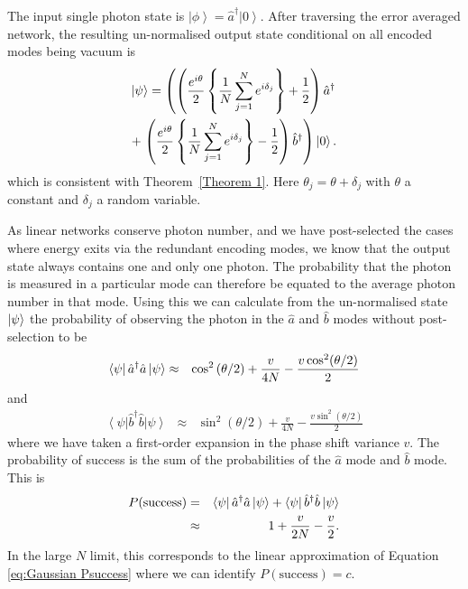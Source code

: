 \documentclass[aps,pra,twocolumn,superscriptaddress,numerical,floatfix]{revtex4-1}
\begin{document}
The input single photon state is $\left|\phi\right\rangle = \hat{a}^{\dagger}\left|0\right\rangle $.  After traversing the error averaged network, the resulting un-normalised output state conditional on all encoded modes being vacuum is
\begin{multline}
	\ket{\psi} = \left(
	\left( \frac{e^{i\theta}}{2} \left\{\frac{1}{N}\sum_{j=1}^{N}e^{i\delta_{j}}\right\} + \frac{1}{2}\right) \hat{a}^{\dagger}  \right. \\
	+ \left. \left(\frac{e^{i\theta}}{2} \left\{\frac{1}{N}\sum_{j=1}^{N}e^{i\delta_{j}}\right\} - \frac{1}{2}\right) \hat{b}^{\dagger} 
	\right)
	\ket{0}.
	\label{eq:1ParbN}
\end{multline}
which is consistent with Theorem~\ref{Theorem 1}. Here $\theta_{j}=\theta+\delta_{j}$ with $\theta$ a constant and $\delta_j$ a random variable. 

As linear networks conserve photon number, and we have post-selected the cases where energy exits via the redundant encoding modes, we know that the output state always contains one and only one photon.  The probability that the photon is measured in a particular mode can therefore be equated to the average photon number in that mode.  Using this we can calculate from the un-normalised state $\ket{\psi}$ the probability of observing the photon in the $\hat{a}$ and $\hat{b}$ modes without post-selection to be 
\begin{eqnarray}
	\bra{\psi} \hat{a}^{\dagger}\hat{a} \ket{\psi} & \approx & \cos^{2}\left(\theta/2\right)+\frac{v}{4N}-\frac{v\cos^{2}(\theta/2)}{2}
\end{eqnarray}
and
\begin{eqnarray}
	\left\langle \psi\right|\hat{b}^{\dagger}\hat{b}\left|\psi\right\rangle & \approx & \sin^{2}\left(\theta/2\right)+\frac{v}{4N}-\frac{v\sin^{2}(\theta/2)}{2}
\end{eqnarray}
where we have taken a first-order expansion in the phase shift variance $v$.
The probability of success is the sum of the probabilities of the $\hat{a}$ mode and $\hat{b}$ mode.  This is 
\begin{eqnarray}
	P(\textrm{success}) & = & \bra{\psi}\hat{a}^{\dagger}\hat{a}\ket{\psi} +\bra{\psi}\hat{b}^{\dagger}\hat{b}\ket{\psi} \\
	& \approx & 1+\frac{v}{2N}-\frac{v}{2}. \label{eq:1pNarbitrary successs}
\end{eqnarray}
In the large $N$ limit, this corresponds to the linear approximation of Equation \ref{eq:Gaussian Psuccess} where we can identify $P(\textrm{success})=c$. 
\end{document}
